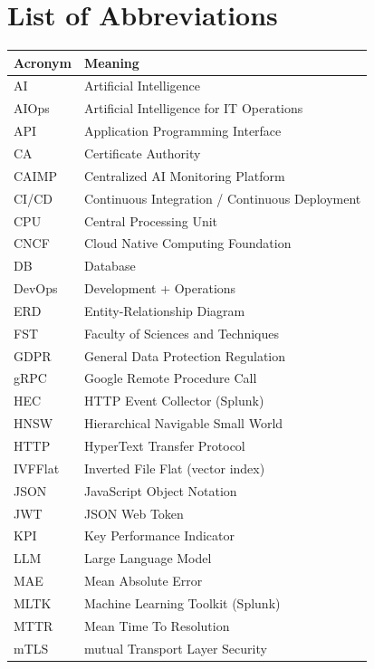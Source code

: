 \chapter*{List of Abbreviations}

\begin{longtable}{@{}lp{11cm}@{}}
\toprule
\textbf{Acronym} & \textbf{Meaning} \\
\midrule
\endhead
\bottomrule
\endfoot
AI    & Artificial Intelligence \\
AIOps & Artificial Intelligence for IT Operations \\
API   & Application Programming Interface \\
CA    & Certificate Authority \\
CAIMP & Centralized AI Monitoring Platform \\
CI/CD & Continuous Integration / Continuous Deployment \\
CPU   & Central Processing Unit \\
CNCF  & Cloud Native Computing Foundation \\
DB    & Database \\
DevOps & Development + Operations \\
ERD   & Entity-Relationship Diagram \\
FST   & Faculty of Sciences and Techniques \\
GDPR  & General Data Protection Regulation \\
gRPC  & Google Remote Procedure Call \\
HEC   & HTTP Event Collector (Splunk) \\
HNSW  & Hierarchical Navigable Small World \\
HTTP  & HyperText Transfer Protocol \\
IVFFlat & Inverted File Flat (vector index) \\
JSON  & JavaScript Object Notation \\
JWT   & JSON Web Token \\
KPI   & Key Performance Indicator \\
LLM   & Large Language Model \\
MAE   & Mean Absolute Error \\
MLTK  & Machine Learning Toolkit (Splunk) \\
MTTR  & Mean Time To Resolution \\
mTLS  & mutual Transport Layer Security \\

\end{longtable}
